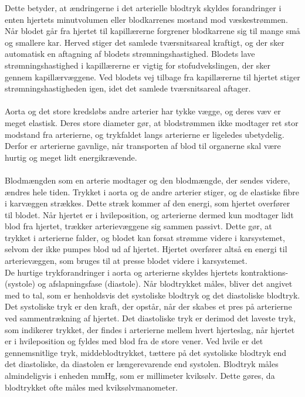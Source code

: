 Dette betyder, at ændringerne i det arterielle blodtryk skyldes forandringer i enten hjertets minutvolumen eller blodkarrenes mostand mod væskestrømmen.
Når blodet går fra hjertet til kapillærerne forgrener blodkarrene sig til mange små og smallere kar. Herved stiger det samlede tværsnitsareal kraftigt, og der sker automatisk en aftagning af blodets strømningshastighed. Blodets lave strømningshastighed i kapillærerne er vigtig for stofudvekslingen, der sker gennem kapillærvæggene. Ved blodets vej tilbage fra kapillærerne til hjertet stiger strømningshastigheden igen, idet det samlede tværsnitsareal aftager. \\\\
Aorta og det store kredsløbs andre arterier har tykke vægge, og deres væv er meget elastisk. Deres store diameter gør, at blodstrømmen ikke modtager ret stor modstand fra arterierne, og trykfaldet langs arterierne er ligeledes ubetydelig. Derfor er arterierne gavnlige, når transporten af blod til organerne skal være hurtig og meget lidt energikrævende.\\\\
Blodmængden som en arterie modtager og den blodmængde, der sendes videre, ændres hele tiden. Trykket i aorta og de andre arterier stiger, og de elastiske fibre i karvæggen strækkes. Dette stræk kommer af den energi, som hjertet overfører til blodet. Når hjertet er i hvileposition, og arterierne dermed kun modtager lidt blod fra hjertet, trækker arterievæggene sig sammen passivt. Dette gør, at trykket i arterierne falder, og blodet kan forsat strømme videre i karsystemet, selvom der ikke pumpes blod ud af hjertet. Hjertet overfører altså en energi til arterievæggen, som bruges til at presse blodet videre i karsystemet. \\
De hurtige trykforandringer i aorta og arterierne skyldes hjertets kontraktions- (systole) og afslapningsfase (diastole). Når blodtrykket måles, bliver det angivet med to tal, som er henholdsvis det systoliske blodtryk og det diastoliske blodtryk. Det systoliske tryk er den kraft, der opstår, når der skabes et pres på arterierne ved sammentrækning af hjertet. Det diastoliske tryk er derimod det laveste tryk, som indikerer trykket, der findes i arterierne mellem hvert hjerteslag, når hjertet er i hvileposition og fyldes med blod fra de store vener. 
Ved hvile er det gennemsnitlige tryk, middeblodtrykket, tættere på det systoliske blodtryk end det diastoliske, da diastolen er længerevarende end systolen. 
Blodtryk måles almindeligvis i enheden mmHg, som er millimeter kviksølv. Dette gøres, da blodtrykket ofte måles med kviksølvmanometer.

